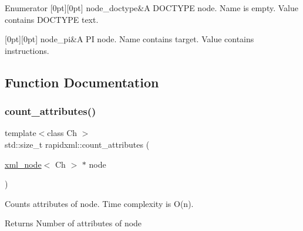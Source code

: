 \begin{DoxyEnumFields}{Enumerator}
[0pt][0pt]{}\mbox{\label{namespacerapidxml_abb456db38f7efb746c4330eed6072a7ca4aaff4e052bd05fd6ad155c028d02de6}} 
node\+\_\+doctype&A D\+O\+C\+T\+Y\+PE node. Name is empty. Value contains D\+O\+C\+T\+Y\+PE text. \\
\hline

[0pt][0pt]{}\mbox{\label{namespacerapidxml_abb456db38f7efb746c4330eed6072a7cac1a92c8842a0b9ea1e47b02fe0627443}} 
node\+\_\+pi&A PI node. Name contains target. Value contains instructions. \\
\hline

\end{DoxyEnumFields}


\subsection{Function Documentation}
\mbox{\label{namespacerapidxml_a6255d15e5d8ad12ebcd7c60da51c97e2}} 
\subsubsection{\texorpdfstring{count\+\_\+attributes()}{count\_attributes()}}
{\footnotesize\ttfamily template$<$class Ch $>$ \\
std\+::size\+\_\+t rapidxml\+::count\+\_\+attributes (\begin{DoxyParamCaption}\item[{\mbox{\hyperlink{classrapidxml_1_1xml__node}{xml\+\_\+node}}$<$ Ch $>$ $\ast$}]{node }\end{DoxyParamCaption})\hspace{0.3cm}{\ttfamily [inline]}}

Counts attributes of node. Time complexity is O(n). \begin{DoxyReturn}{Returns}
Number of attributes of node 
\end{DoxyReturn}
\mbox{\label{namespacerapidxml_a21c1cf2814019385e6b8d09e75af1d34}} 

